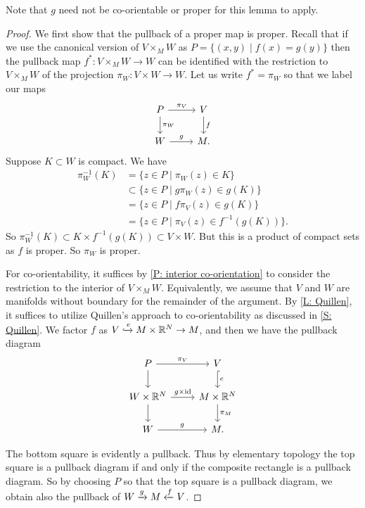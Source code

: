 Note that $g$ need not be co-orientable or proper for this lemma to apply.

\begin{proof}
	We first show that the pullback of a proper map is proper.
	Recall that if we use the canonical version of $V \times_M W$ as $P = \{(x,y) \mid f(x) = g(y )\}$ then the pullback map $f^*:V\times_MW\to W$ can be identified with the restriction to $V \times_M W$ of the projection $\pi_W: V\times W\to W$. Let us write $f^*=\pi_W$ so that we label our maps
	\[
	\begin{tikzcd}
		P \arrow[r, "\pi_V"] \arrow[d, "\pi_W"] & V \arrow[d, "f"] \\
		W \arrow[r, "g"] & M.
	\end{tikzcd}
	\]
	Suppose $K \subset W$ is compact.
	We have
	\begin{align*}
		\pi_W^{-1}(K)& = \{z \in P \mid \pi_W(z) \in K\}\\
		& \subset \{z \in P \mid g\pi_W(z) \in g(K)\} \\
		& = \{z \in P \mid f\pi_V(z) \in g(K)\} \\
		& = \{z \in P \mid \pi_V(z) \in f^{-1}(g(K))\}.
	\end{align*}
	So $\pi_W^{-1}(K) \subset K \times f^{-1}(g(K)) \subset V \times W$.
	But this is a product of compact sets as $f$ is proper.
	So $\pi_W$ is proper.

	For co-orientability, it suffices by \cref{P: interior co-orientation} to consider the restriction to the interior of $V \times_M W$. Equivalently, we assume that $V$ and $W$ are manifolds without boundary for the remainder of the argument.
	By \cref{L: Quillen}, it suffices to utilize Quillen's approach to co-orientability as discussed in \cref{S: Quillen}.
	We factor $f$ as $V \xhookrightarrow{e} M \times \mathbb{R}^N \to M$, and then we have the pullback diagram
	\begin{equation}\label{D: pullback}
		\begin{tikzcd}
			P \arrow[r, "\pi_V"] \arrow[d] & V \arrow[hookrightarrow, d, "e"] \\
			W \times \R^N \arrow[r, "g \times \id"] \arrow[d] & M \times \R^N \arrow[d, "\pi_M"] \\
			W \arrow[r, "g"] & M.
		\end{tikzcd}
	\end{equation}

	The bottom square is evidently a pullback.
	Thus by elementary topology the top square is a pullback diagram if and only if the composite rectangle is a pullback diagram.
	So by choosing $P$ so that the top square is a pullback diagram, we obtain also the pullback of $W \xrightarrow{g} M\xleftarrow{f} V$.


\end{proof}
